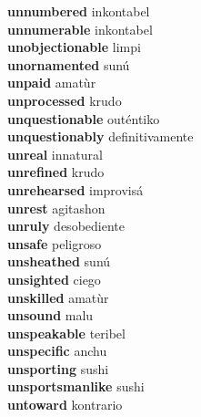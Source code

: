 \textbf{unnumbered } inkontabel \\
\textbf{unnumerable } inkontabel \\
\textbf{unobjectionable } limpi \\
\textbf{unornamented } sunú \\
\textbf{unpaid } amatùr \\
\textbf{unprocessed } krudo \\
\textbf{unquestionable } outéntiko \\
\textbf{unquestionably } definitivamente \\
\textbf{unreal } innatural \\
\textbf{unrefined } krudo \\
\textbf{unrehearsed } improvisá \\
\textbf{unrest } agitashon \\
\textbf{unruly } desobediente \\
\textbf{unsafe } peligroso \\
\textbf{unsheathed } sunú \\
\textbf{unsighted } ciego \\
\textbf{unskilled } amatùr \\
\textbf{unsound } malu \\
\textbf{unspeakable } teribel \\
\textbf{unspecific } anchu \\
\textbf{unsporting } sushi \\
\textbf{unsportsmanlike } sushi \\
\textbf{untoward } kontrario \\
